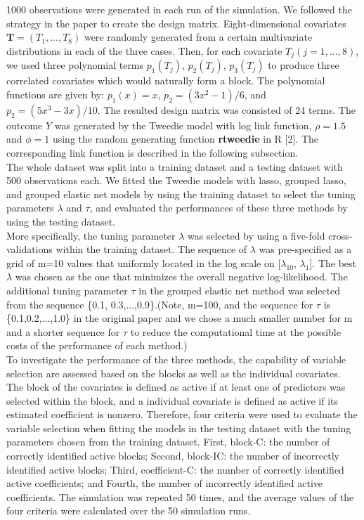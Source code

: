 \documentclass[paper=a4, fontsize=11pt]{scrartcl} %
\begin{document}
1000 observations were generated in each run of the simulation. We followed the strategy in the paper to create the design matrix. Eight-dimensional covariates $\textbf{T}=(T_{1},...,T_{8})$ were randomly generated from a certain multivariate distributions in each of the three cases. Then, for each covariate $\textit{T}_{j} (j=1,...,8)$, we used three polynomial terms $p_{1}(T_{j})$, $p_{2}(T_{j})$, $p_{3}(T_{j})$ to produce three correlated covariates which would naturally form a block. The polynomial functions are given by: $p_{1}(x)=x$, $p_{2}=(3x^{2}-1)/6$, and $p_{2}=(5x^{3}-3x)/10$. The resulted design matrix was consisted of 24 terms. The outcome $Y$ was generated by the Tweedie model with log link function, $\rho=1.5$ and $\phi=1$ using the random generating function \textbf{rtweedie} in R [2]. The corresponding link function is described in the following subsection.\\


The whole dataset was split into a training dataset and a testing dataset with 500 observations each. We fitted the Tweedie models with lasso, grouped lasso, and grouped elastic net models by using the training dataset to select the tuning parameters $\lambda$ and $\tau$, and evaluated the performances of these three methods by using the testing dataset.\\

More specifically, the tuning parameter $\lambda$ was selected by using a five-fold cross-validations within the training dataset. The sequence of $\lambda$ was pre-specified as a grid of m=10 values that uniformly located in the log scale on [$\lambda_{10}$, $\lambda_{1}$]. The best $\lambda$ was chosen as the one that minimizes the overall negative log-likelihood. The additional tuning parameter $\tau$ in the grouped elastic net method was selected from the sequence \{0.1, 0.3,...,0.9\}.(Note, m=100, and the sequence for $\tau$ is \{0.1,0.2,...,1.0\} in the original paper and we chose a much smaller number for m and a shorter sequence for $\tau$ to reduce the computational time at the possible costs of the performance of each method.)\\

To investigate the performance of the three methods, the capability of variable selection are assessed based on the blocks as well as the individual covariates. The block of the covariates is defined as active if at least one of predictors was selected within the block, and a individual covariate is defined as active if its estimated coefficient is nonzero. Therefore, four criteria were used to evaluate the variable selection when fitting the models in the testing dataset with the tuning parameters chosen from the training dataset. First, block-C: the number of correctly identified active blocks; Second, block-IC: the number of incorrectly identified active blocks; Third, coefficient-C: the number of correctly identified active coefficients; and Fourth, the number of incorrectly identified active coefficients. The simulation was repeated 50 times, and the average values of the four criteria were calculated over the 50 simulation runs.
\end{document}
